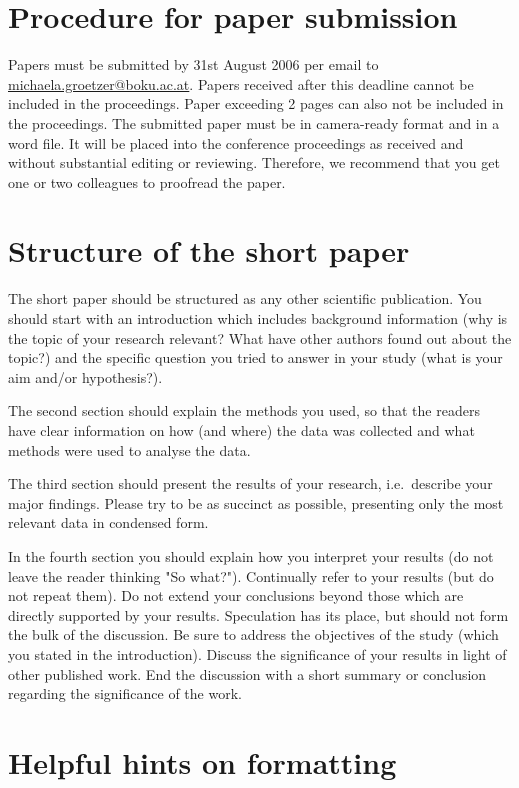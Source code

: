 \documentclass[english]{oegatb}
\begin{document}
\section{Procedure for paper submission}

Papers must be submitted by 31st August 2006 per email to
\url{michaela.groetzer@boku.ac.at}.
Papers received after this deadline cannot be included in the proceedings.
Paper exceeding 2 pages can also not be included in the proceedings.
The submitted paper must be in camera-ready format and in a word file.
It will be placed into the conference proceedings as received
and without substantial editing or reviewing.
Therefore, we recommend that you get one or two colleagues
to proofread the paper.


\section{Structure of the short paper}

The short paper should be structured as any other scientific publication.
You should start with an introduction which includes background information
(why is the topic of your research relevant?
What have other authors found out about the topic?)
and the specific question you tried to answer in your study
(what is your aim and/or hypothesis?).

The second section should explain the methods you used,
so that the readers have clear information on how (and where)
the data was collected and what methods were used to analyse the data.

The third section should present the results of your research,
i.e.\ describe your major findings.
Please try to be as succinct as possible,
presenting only the most relevant data in condensed form.

In the fourth section you should explain how you interpret your results
(do not leave the reader thinking "So what?").
Continually refer to your results (but do not repeat them).
Do not extend your conclusions beyond those
which are directly supported by your results.
Speculation has its place, but should not form the bulk of the discussion.
Be sure to address the objectives of the study
(which you stated in the introduction).
Discuss the significance of your results in light of other published work.
End the discussion with a short summary or conclusion
regarding the significance of the work.


\section{Helpful hints on formatting}
\end{document}
